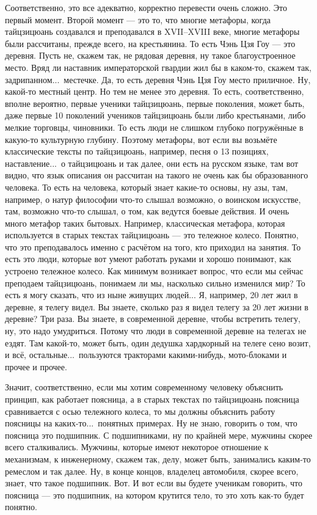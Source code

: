Соответственно,  это все адекватно, корректно 
перевести очень сложно.  Это первый момент. Второй 
момент --- это то, что многие метафоры,  когда
тайцзицюань создавался и преподавался в XVII--XVIII веке,
многие метафоры были рассчитаны, прежде всего,  на 
крестьянина. То есть Чэнь Цзя Гоу --- это деревня. Пусть 
не, скажем так, не рядовая деревня,  ну такое 
благоустроенное место.  Вряд ли наставник 
императорской гвардии жил бы в каком-то, скажем так,  
задрипанном...\ местечке. Да, то есть деревня Чэнь Цзя Гоу
место приличное.  Ну, какой-то местный центр. Но тем не 
менее это деревня. То есть, соответственно,  вполне 
вероятно,  первые ученики тайцзицюань,  первые 
поколения, может быть, даже первые 10 поколений 
учеников тайцзицюань были либо крестьянами, либо 
мелкие торговцы, чиновники. То есть люди не слишком 
глубоко погружённые в какую-то культурную глубину. 
Поэтому метафоры, вот если вы возьмёте классические 
тексты по тайцзицюань, например, песня о 13 позициях, 
наставление...\ о тайцзицюань и так далее,  они есть на 
русском языке, там вот видно,  что язык описания он 
рассчитан на такого не очень как бы образованного 
человека. То есть на человека,  который знает какие-то 
основы, ну азы, там, например, о натур философии что-то 
слышал  возможно, о воинском искусстве, там, возможно
что-то слышал, о том, как ведутся боевые действия. И 
очень много метафор таких бытовых. Например,  
классическая метафора, которая используется в старых 
текстах тайцзицюань --- это тележное колесо.  Понятно,  
что это преподавалось именно с расчётом на того, кто 
приходил на занятия. То есть это люди, которые вот 
умеют работать руками и хорошо понимают, как устроено 
тележное колесо.  Как минимум возникает вопрос, что 
если мы сейчас преподаем тайцзицюань, понимаем ли мы, 
насколько сильно изменился мир? То есть я могу 
сказать, что из ныне живущих людей... Я, например, 20 лет 
жил в деревне, я телегу видел. Вы знаете, сколько раз я 
видел телегу за 20 лет жизни в деревне? Три раза. Вы 
знаете, в современной деревне, чтобы встретить телегу, 
ну, это надо умудриться. Потому что люди в современной 
деревне на телегах не ездят. Там какой-то, может быть, 
один дедушка хардкорный на телеге сено возит, и всё, 
остальные...\ пользуются тракторами какими-нибудь, 
мото-блоками и прочее и прочее.

Значит, 
соответственно,  если мы хотим современному человеку 
объяснить принцип, как работает поясница,  а в старых 
текстах по тайцзицюань поясница сравнивается с осью 
тележного колеса, то мы должны объяснить работу 
поясницы на каких-то...\ понятных примерах. Ну не знаю,  
говорить о том, что поясница это подшипник. С 
подшипниками, ну по крайней мере, мужчины скорее всего 
сталкивались. Мужчины, которые имеют некоторое 
отношение к механизмам, к инженерному, скажем так, 
делу, может быть, занимались каким-то ремеслом и так 
далее.  Ну, в конце концов,  владелец автомобиля, скорее 
всего, знает, что такое подшипник. Вот. И вот если вы 
будете ученикам говорить, что поясница --- это 
подшипник, на котором крутится тело, то это хоть как-то 
будет понятно.

